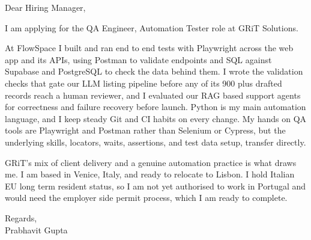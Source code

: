 \documentclass[a4paper,11pt]{article}
\begin{document}
Dear Hiring Manager,

I am applying for the QA Engineer, Automation Tester role at GRiT Solutions.

At FlowSpace I built and ran end to end tests with Playwright across the web app and its APIs, using Postman to validate endpoints and SQL against Supabase and PostgreSQL to check the data behind them. I wrote the validation checks that gate our LLM listing pipeline before any of its 900 plus drafted records reach a human reviewer, and I evaluated our RAG based support agents for correctness and failure recovery before launch. Python is my main automation language, and I keep steady Git and CI habits on every change. My hands on QA tools are Playwright and Postman rather than Selenium or Cypress, but the underlying skills, locators, waits, assertions, and test data setup, transfer directly.

GRiT's mix of client delivery and a genuine automation practice is what draws me. I am based in Venice, Italy, and ready to relocate to Lisbon. I hold Italian EU long term resident status, so I am not yet authorised to work in Portugal and would need the employer side permit process, which I am ready to complete.

Regards,\\
Prabhavit Gupta
\end{document}
